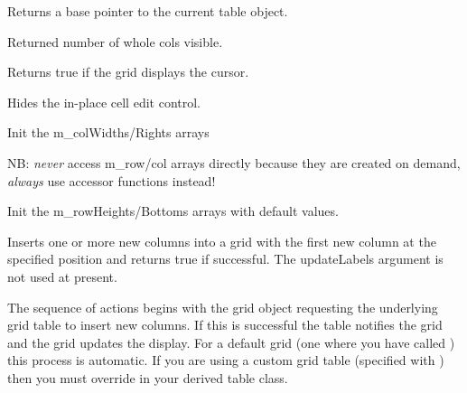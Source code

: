 \label{wxgridgettable}


Returns a base pointer to the current table object.



\label{wxgridgetviewwidth}


Returned number of whole cols visible.



\label{wxgridgehascursor}


Returns true if the grid displays the cursor.



\label{wxgridhidecelleditcontrol}


Hides the in-place cell edit control.



\label{wxgridinitcolwidths}


Init the m\_colWidths/Rights arrays



\label{wxgridinitrowheights}


NB: {\it never} access m\_row/col arrays directly because they are created
on demand, {\it always} use accessor functions instead!

Init the m\_rowHeights/Bottoms arrays with default values.



\label{wxgridinsertcols}


Inserts one or more new columns into a grid with the first new column at the
specified position and returns true if successful. The updateLabels argument is not
used at present.

The sequence of actions begins with the grid object requesting the underlying grid
table to insert new columns. If this is successful the table notifies the grid and the
grid updates the display. For a default grid (one where you have called 
) this process is automatic. If you are
using a custom grid table (specified with )
then you must override 
 in your derived
table class.



